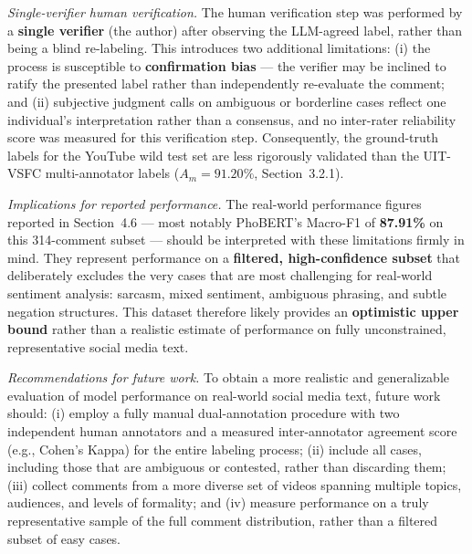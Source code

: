 \documentclass[12pt]{report} %
\begin{document}
\textit{Single-verifier human verification.} The human verification step was performed by a \textbf{single verifier} (the author) after observing the LLM-agreed label, rather than being a blind re-labeling. This introduces two additional limitations: (i) the process is susceptible to \textbf{confirmation bias} — the verifier may be inclined to ratify the presented label rather than independently re-evaluate the comment; and (ii) subjective judgment calls on ambiguous or borderline cases reflect one individual's interpretation rather than a consensus, and no inter-rater reliability score was measured for this verification step. Consequently, the ground-truth labels for the YouTube wild test set are less rigorously validated than the UIT-VSFC multi-annotator labels (\(A_m = 91.20\%\), Section~3.2.1).

\textit{Implications for reported performance.} The real-world performance figures reported in Section~4.6 — most notably PhoBERT's Macro-F1 of \textbf{87.91\%} on this 314-comment subset — should be interpreted with these limitations firmly in mind. They represent performance on a \textbf{filtered, high-confidence subset} that deliberately excludes the very cases that are most challenging for real-world sentiment analysis: sarcasm, mixed sentiment, ambiguous phrasing, and subtle negation structures. This dataset therefore likely provides an \textbf{optimistic upper bound} rather than a realistic estimate of performance on fully unconstrained, representative social media text.

\textit{Recommendations for future work.} To obtain a more realistic and generalizable evaluation of model performance on real-world social media text, future work should: (i) employ a fully manual dual-annotation procedure with two independent human annotators and a measured inter-annotator agreement score (e.g., Cohen's Kappa) for the entire labeling process; (ii) include all cases, including those that are ambiguous or contested, rather than discarding them; (iii) collect comments from a more diverse set of videos spanning multiple topics, audiences, and levels of formality; and (iv) measure performance on a truly representative sample of the full comment distribution, rather than a filtered subset of easy cases.
\end{document}
